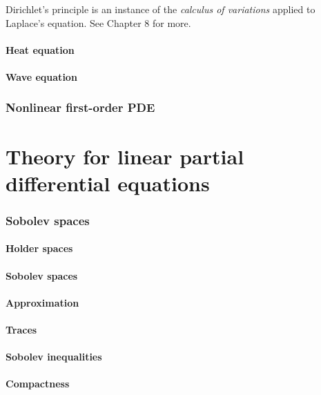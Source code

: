 \documentclass[a4paper,12pt]{report}
\begin{document}
Dirichlet's principle is an instance of the \emph{calculus of variations} applied to Laplace's equation. See Chapter 8 for more.




\subsection{Heat equation}

\subsection{Wave equation}

\section{Nonlinear first-order PDE}

\part{Theory for linear partial differential equations}
\section{Sobolev spaces}
\subsection{Holder spaces}

\subsection{Sobolev spaces}

\subsection{Approximation}

\subsection{Traces}

\subsection{Sobolev inequalities}

\subsection{Compactness}
\end{document}
